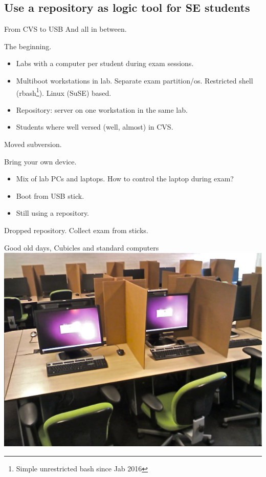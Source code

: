 \subsection[Repository]{Use a repository as logic tool for SE students}
\begin{frame}{From CVS to USB}
  And all in between.
  \begin{description}[short]
  \item[2005] The beginning.
    \begin{itemize}
    \item Labs with a computer per student during exam sessions.
    \item Multiboot workstations in lab. Separate exam 
      partition/os. Restricted shell (rbash\footnote{Simple
        unrestricted bash since Jab 2016}). Linux (SuSE) based.
    \item Repository:  server on one workstation in the same lab.
    \item Students where well versed (well, almost) in CVS.
    \end{itemize}
  \item[2009] Moved subversion.
  \item[2012] Bring your own device.
    \begin{itemize}
    \item Mix of lab PCs and laptops. How to control the laptop during exam?
    \item Boot from USB stick.
    \item Still using a repository.
    \end{itemize}
  \item[2015] Dropped repository. Collect exam from sticks.
  \end{description}
\end{frame}

\begin{frame}{Good old days, Cubicles and standard computers}
  \includegraphics[width=\textwidth]{figures/AssessmentRoom.jpg}
\end{frame}

